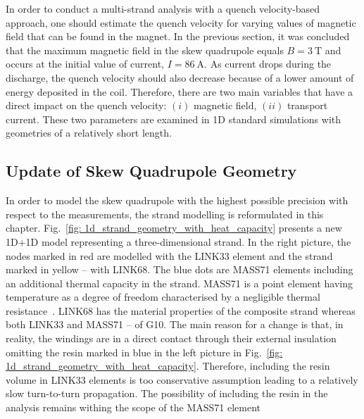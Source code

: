
In order to conduct a multi-strand analysis with a quench velocity-based approach, one should estimate the quench velocity for varying values of magnetic field that can be found in the magnet. In the previous section, it was concluded that the maximum magnetic field in the skew quadrupole equals $B=3~\text{T}$ and occurs at the initial value of current, $I=86~\text{A}$. As current drops during the discharge, the quench velocity should also decrease because of a lower amount of energy deposited in the coil. Therefore, there are two main variables that have a direct impact on the quench velocity: $(i)$ magnetic field, $(ii)$ transport current. These two parameters are examined in 1D standard simulations with geometries of a relatively short length. 
\subsection{Update of Skew Quadrupole Geometry}

In order to model the skew quadrupole with the highest possible precision with respect to the measurements, the strand modelling is reformulated in this chapter. Fig.~\ref{fig: 1d_strand_geometry_with_heat_capacity} presents a new 1D+1D model representing a three-dimensional strand. In the right picture, the nodes marked in red are modelled with the LINK33 element and the strand marked in yellow -- with LINK68. The blue dots are MASS71 elements including an additional thermal capacity in the strand. MASS71 is a point element having temperature as a degree of freedom characterised by a negligible thermal resistance~\cite{ansys_element_manual}. LINK68 has the material properties of the composite strand whereas both LINK33 and MASS71 -- of G10. The main reason for a change is that, in reality, the windings are in a direct contact through their external insulation omitting the resin marked in blue in the left picture in Fig.~\ref{fig: 1d_strand_geometry_with_heat_capacity}. Therefore, including the resin volume in LINK33 elements is too conservative assumption leading to a relatively slow turn-to-turn propagation. The possibility of including the resin in the analysis remains withing the scope of the MASS71 element

